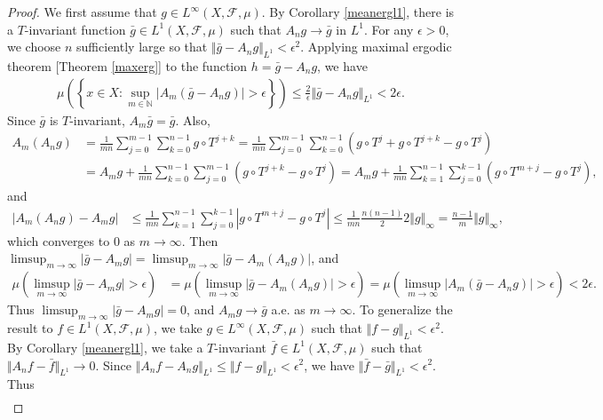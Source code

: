 \documentclass{article}
\numberwithin{equation}{section}
\newcommand{\bbN}{\mathbb{N}}
\newcommand{\scr}{\mathscr}
\theoremstyle{plain}
\theoremstyle{definition}
\begin{document}
\begin{proof}
We first assume that $g\in L^\infty(X,\scr{F},\mu)$. By Corollary \ref{meanergl1}, there is a $T$-invariant function $\bar{g}\in L^1(X,\scr{F},\mu)$ such that $A_ng\to\bar{g}$ in $L^1$. For any $\epsilon>0$, we choose $n$ sufficiently large so that $\Vert\bar{g}-A_ng\Vert_{L^1}<\epsilon^2$. Applying maximal ergodic theorem [Theorem \ref{maxerg}] to the function $h=\bar{g}-A_ng$, we have
\begin{align*}
	\mu\left(\left\{x\in X:\sup_{m\in\bbN}\left\vert A_m(\bar{g}-A_ng)\right\vert>\epsilon\right\}\right)\leq\frac{2}{\epsilon}\Vert\bar{g}-A_ng\Vert_{L^1}<2\epsilon.
\end{align*}
Since $\bar{g}$ is $T$-invariant, $A_m\bar{g}=\bar{g}$. Also,
\begin{align*}
	A_m(A_ng)&=\frac{1}{mn}\sum_{j=0}^{m-1}\sum_{k=0}^{n-1}g\circ T^{j+k}=\frac{1}{mn}\sum_{j=0}^{m-1}\sum_{k=0}^{n-1}\left(g\circ T^j+g\circ T^{j+k}-g\circ T^j\right)\\
	&=A_mg+\frac{1}{mn}\sum_{k=0}^{n-1}\sum_{j=0}^{m-1}\left(g\circ T^{j+k}-g\circ T^j\right)= A_mg+\frac{1}{mn}\sum_{k=1}^{n-1}\sum_{j=0}^{k-1}\left(g\circ T^{m+j}-g\circ T^j\right),
\end{align*}
and
\begin{align*}
	\vert A_m(A_ng)-A_mg\vert&\leq\frac{1}{mn}\sum_{k=1}^{n-1}\sum_{j=0}^{k-1}\left\vert g\circ T^{m+j}-g\circ T^j\right\vert\leq\frac{1}{mn}\frac{n(n-1)}{2} 2\Vert g\Vert_\infty=\frac{n-1}{m}\Vert g\Vert_\infty,
\end{align*}
which converges to $0$ as $m\to\infty$. Then $\limsup_{m\to\infty}\vert\bar{g}-A_mg\vert=\limsup_{m\to\infty}\vert\bar{g}-A_m(A_ng)\vert$, and
\begin{align*}
\mu\left(\limsup_{m\to\infty}\vert\bar{g}-A_mg\vert>\epsilon\right)&=\mu\left(\limsup_{m\to\infty}\vert\bar{g}-A_m(A_ng)\vert>\epsilon\right)=\mu\left(\limsup_{m\to\infty}\vert A_m(\bar{g}-A_ng)\vert>\epsilon\right)<2\epsilon.
\end{align*}
Thus $\limsup_{m\to\infty}\vert\bar{g}-A_mg\vert=0$, and $A_mg\to\bar{g}$ a.e. as $m\to\infty$. To generalize the result to $f\in L^1(X,\scr{F},\mu)$, we take $g\in L^\infty(X,\scr{F},\mu)$ such that $\Vert f-g\Vert_{L^1}<\epsilon^2$. By Corollary \ref{meanergl1}, we take a $T$-invariant $\bar{f}\in L^1(X,\scr{F},\mu)$ such that $\Vert A_nf-\bar{f}\Vert_{L^1}\to 0$. Since $\Vert A_nf-A_ng\Vert_{L^1}\leq\Vert f-g\Vert_{L^1}<\epsilon^2$, we have $\Vert\bar{f}-\bar{g}\Vert_{L^1}<\epsilon^2$. Thus
\begin{align*}

\end{align*}
\end{proof}
\end{document}

